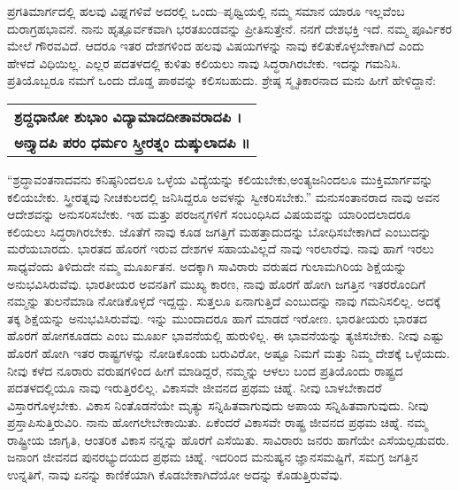ಪ್ರಗತಿಮಾರ್ಗದಲ್ಲಿ ಹಲವು ವಿಘ್ನಗಳಿವೆ ಅದರಲ್ಲಿ ಒಂದು–ಪೃಥ್ವಿಯಲ್ಲಿ ನಮ್ಮ ಸಮಾನ ಯಾರೂ ಇಲ್ಲವೆಂಬ ದುರಾಗ್ರಹಭಾವನೆ. ನಾನು ಹೃತ್ಪೂರ್ವಕವಾಗಿ ಭರತಖಂಡವನ್ನು ಪ್ರೀತಿಸುತ್ತೇನೆ. ನನಗೆ ದೇಶಭಕ್ತಿ ಇದೆ. ನಮ್ಮ ಪೂರ್ವಿಕರ ಮೇಲೆ ಗೌರವವಿದೆ. ಆದರೂ ಇತರ ದೇಶಗಳಿಂದ ಹಲವು ವಿಷಯಗಳನ್ನು ನಾವು ಕಲಿತುಕೊಳ್ಳಬೇಕಾಗಿದೆ ಎಂದು ಹೇಳದೆ ವಿಧಿಯಿಲ್ಲ. ಎಲ್ಲರ ಪದತಳದಲ್ಲಿ ಕುಳಿತು ಕಲಿಯಲು ನಾವು ಸಿದ್ಧರಾಗಿರಬೇಕು. ಇದನ್ನು ಗಮನಿಸಿ. ಪ್ರತಿಯೊಬ್ಬರೂ ನಮಗೆ ಒಂದು ದೊಡ್ಡ ಪಾಠವನ್ನು ಕಲಿಸಬಹುದು. ಶ್ರೇಷ್ಠ ಸ್ಮೃತಿಕಾರನಾದ ಮನು ಹೀಗೆ ಹೇಳಿದ್ದಾನೆ:

\begin{longtable}{@{}l@{}}
\textbf{ಶ್ರದ್ದಧಾನೋ ಶುಭಾಂ ವಿದ್ಯಾಮಾದದೀತಾವರಾದಪಿ ।} \\
\textbf{ಅನ್ತ್ಯಾದಪಿ ಪರಂ ಧರ್ಮಂ ಸ್ತ್ರೀರತ್ನಂ ದುಷ್ಕುಲಾದಪಿ ॥} \\
\end{longtable}

\newpage

“ಶ್ರದ್ಧಾವಂತನಾದವನು ಕನಿಷ್ಠನಿಂದಲೂ ಒಳ್ಳೆಯ ವಿದ್ಯೆಯನ್ನು ಕಲಿಯಬೇಕು,\break ಅಂತ್ಯಜನಿಂದಲೂ ಮುಕ್ತಿಮಾರ್ಗವನ್ನು ಕಲಿಯಬೇಕು. ಸ್ತ್ರೀರತ್ನವು ನೀಚಕುಲದಲ್ಲಿ ಜನಿಸಿದ್ದರೂ ಅವಳನ್ನು ಸ್ವೀಕರಿಸಬೇಕು.” ಮನುಸಂತಾನರಾದ ನಾವು ಅವನ ಆದೇಶವನ್ನು ಅನುಸರಿಸಬೇಕು. ಇಹ ಮತ್ತು ಪರಜನ್ಮಗಳಿಗೆ ಸಂಬಂಧಿಸಿದ ವಿಷಯವನ್ನು ಯಾರಿಂದಲಾದರೂ ಕಲಿಯಲು ಸಿದ್ಧರಾಗಿರಬೇಕು. ಜೊತೆಗೆ ನಾವು ಕೂಡ ಜಗತ್ತಿಗೆ ಮಹತ್ತಾದುದನ್ನು ಬೋಧಿಸಬೇಕಾಗಿದೆ ಎಂಬುದನ್ನು ಮರೆಯಬಾರದು. ಭಾರತದ ಹೊರಗೆ ಇರುವ ದೇಶಗಳ ಸಹಾಯವಿಲ್ಲದೆ ನಾವು ಇರಲಾರೆವು. ನಾವು ಹಾಗೆ ಇರಲು ಸಾಧ್ಯವೆಂದು ತಿಳಿದುದೇ ನಮ್ಮ ಮೂರ್ಖತನ. ಅದಕ್ಕಾಗಿ ಸಾವಿರಾರು ವರುಷದ ಗುಲಾಮಗಿರಿಯ ಶಿಕ್ಷೆಯನ್ನು ಅನುಭವಿಸಿರುವೆವು. ಭಾರತೀಯರ ಅವನತಿಗೆ ಮುಖ್ಯ ಕಾರಣ, ನಾವು ಹೊರಗೆ ಹೋಗಿ ಜಗತ್ತಿನ ಇತರರೊಂದಿಗೆ ನಮ್ಮನ್ನು ತುಲನೆಮಾಡಿ ನೋಡಿಕೊಳ್ಳದೆ ಇದ್ದದ್ದು. ಸುತ್ತಲೂ ಏನಾಗುತ್ತಿದೆ ಎಂಬುದನ್ನು ನಾವು ಗಮನಿಸಲಿಲ್ಲ. ಅದಕ್ಕೆ ತಕ್ಕ ಶಿಕ್ಷೆಯನ್ನು ಅನುಭವಿಸಿರುವೆವು. ಇನ್ನು ಮುಂದಾದರೂ ಹಾಗೆ ಮಾಡದೆ ಇರೋಣ. ಭಾರತೀಯರು ಭಾರತದ ಹೊರಗೆ ಹೋಗಕೂಡದು ಎಂಬ ಮೂರ್ಖ ಭಾವನೆಯಲ್ಲಿ ಹುರುಳಿಲ್ಲ. ಈ ಭಾವನೆಯನ್ನು ತ್ಯಜಿಸಬೇಕು. ನೀವು ಎಷ್ಟು ಹೊರಗೆ ಹೋಗಿ ಇತರ ರಾಷ್ಟ್ರಗಳನ್ನು ನೋಡಿಕೊಂಡು ಬರುವಿರೋ, ಅಷ್ಟೂ ನಿಮಗೆ ಮತ್ತು ನಿಮ್ಮ ದೇಶಕ್ಕೆ ಒಳ್ಳೆಯದು. ನೀವು ಕಳೆದ ನೂರಾರು ವರುಷಗಳಿಂದ ಹೀಗೆ ಮಾಡಿದ್ದರೆ, ನಮ್ಮನ್ನು ಆಳಲು ಬಂದ ಪ್ರತಿಯೊಂದು ರಾಷ್ಟ್ರದ ಪದತಳದಲ್ಲಿಯೂ ನಾವು ಇರು\-ತ್ತಿರಲಿಲ್ಲ. ವಿಕಾಸವೇ ಜೀವನದ ಪ್ರಥಮ ಚಿಹ್ನೆ. ನೀವು ಬಾಳಬೇಕಾದರೆ ವಿಸ್ತಾರಗೊಳ್ಳಬೇಕು. ವಿಕಾಸ ನಿಂತೊಡನೆಯೇ ಮೃತ್ಯು ಸನ್ನಿಹಿತವಾಗುವುದು ಅಪಾಯ ಸನ್ನಿಹಿತವಾಗುವುದು. ನೀವು ಪ್ರಸ್ತಾಪಿಸುತ್ತಿರುವಿರಿ. ನಾನು ಹೋಗಲೇಬೇಕಾಯಿತು. ಏಕೆಂದರೆ ವಿಕಾಸವೇ ರಾಷ್ಟ್ರ ಜೀವನದ ಪ್ರಥಮ ಚಿಹ್ನೆ. ನಮ್ಮ ರಾಷ್ಟ್ರೀಯ ಜಾಗೃತಿ, ಆಂತರಿಕ ವಿಕಾಸ ನನ್ನನ್ನು ಹೊರಗೆ ಎಸೆಯಿತು. ಸಾವಿರಾರು ಜನರು ಹಾಗೆಯೇ ಎಸೆಯಲ್ಪಡುವರು. ಜನಾಂಗ ಜೀವನದ ಪುನರಭ್ಯುದಯದ ಪ್ರಥಮ ಚಿಹ್ನೆ. ಇದರಿಂದ ಮನುಷ್ಯನ ಜ್ಞಾನಸಮಷ್ಟಿಗೆ, ಸಮಗ್ರ ಜಗತ್ತಿನ ಉನ್ನತಿಗೆ, ನಾವು ಏನನ್ನು ಕಾಣಿಕೆಯಾಗಿ ಕೊಡಬೇಕಾಗಿದೆಯೋ ಅದನ್ನು ಕೊಡುತ್ತಿರುವೆವು.

